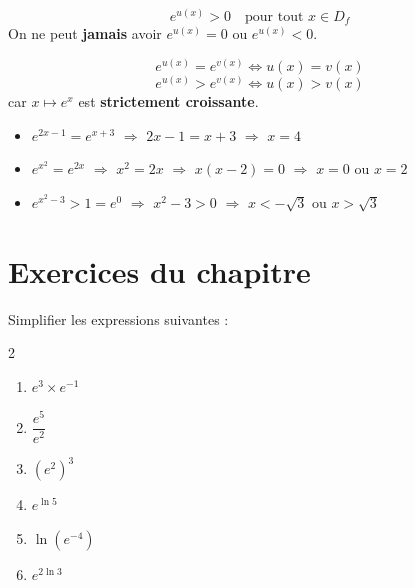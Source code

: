 \begin{propriete}[Signe de $e^{u(x)}$]
  \[
    e^{u(x)} > 0 \quad \text{pour tout } x \in D_f
  \]
  On ne peut \textbf{jamais} avoir $e^{u(x)} = 0$ ou $e^{u(x)} < 0$.
\end{propriete}

\begin{methode}[R\'{e}soudre $e^{u(x)} = e^{v(x)}$ et $e^{u(x)} > e^{v(x)}$]
  \[
    e^{u(x)} = e^{v(x)} \iff u(x) = v(x)
  \]
  \[
    e^{u(x)} > e^{v(x)} \iff u(x) > v(x)
  \]
  car $x \mapsto e^x$ est \textbf{strictement croissante}.
\end{methode}

\begin{exemple}
  \begin{itemize}
    \item $e^{2x-1} = e^{x+3}$
    \quad $\Rightarrow$ \quad $2x-1 = x+3$
    \quad $\Rightarrow$ \quad $x = 4$

    \medskip
    \item $e^{x^2} = e^{2x}$
    \quad $\Rightarrow$ \quad $x^2 = 2x$
    \quad $\Rightarrow$ \quad $x(x-2) = 0$
    \quad $\Rightarrow$ \quad $x = 0$ ou $x = 2$

    \medskip
    \item $e^{x^2 - 3} > 1 = e^0$
    \quad $\Rightarrow$ \quad $x^2 - 3 > 0$
    \quad $\Rightarrow$ \quad $x < -\sqrt{3}$ ou $x > \sqrt{3}$
  \end{itemize}
\end{exemple}

\newpage
\section*{Exercices du chapitre}

\begin{exercice}
  Simplifier les expressions suivantes :
  \begin{multicols}{2}
  \begin{enumerate}
    \item $e^3 \times e^{-1}$
    \item $\dfrac{e^5}{e^2}$
    \item $(e^2)^3$
    \item $e^{\ln 5}$
    \item $\ln(e^{-4})$
    \item $e^{2\ln 3}$
  \end{enumerate}
  \end{multicols}
\end{exercice}

